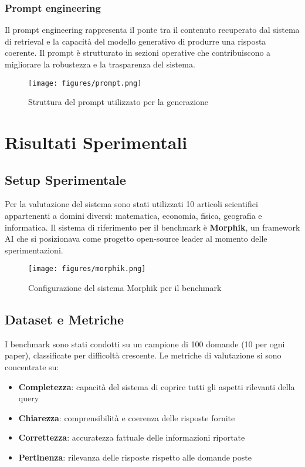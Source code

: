 \documentclass[12pt,a4paper]{article}
\begin{document}
\subsubsection{Prompt engineering}
Il prompt engineering rappresenta il ponte tra il contenuto recuperato dal sistema di retrieval e la capacità del modello generativo di produrre una risposta coerente. Il prompt è strutturato in sezioni operative che contribuiscono a migliorare la robustezza e la trasparenza del sistema.

\begin{figure}[!ht]
\centering
\texttt{[image: figures/prompt.png]}
\caption{Struttura del prompt utilizzato per la generazione}
\label{fig:prompt_structure}
\end{figure}

\section{Risultati Sperimentali}

\subsection{Setup Sperimentale}
Per la valutazione del sistema sono stati utilizzati 10 articoli scientifici appartenenti a domini diversi: matematica, economia, fisica, geografia e informatica. Il sistema di riferimento per il benchmark è \textbf{Morphik}, un framework AI che si posizionava come progetto open-source leader al momento delle sperimentazioni.

\begin{figure}[H]
\centering
\texttt{[image: figures/morphik.png]}
\caption{Configurazione del sistema Morphik per il benchmark}
\label{fig:morphik_config}
\end{figure}

\subsection{Dataset e Metriche}
I benchmark sono stati condotti su un campione di 100 domande (10 per ogni paper), classificate per difficoltà crescente. Le metriche di valutazione si sono concentrate su:

\begin{itemize}
    \item \textbf{Completezza}: capacità del sistema di coprire tutti gli aspetti rilevanti della query
    \item \textbf{Chiarezza}: comprensibilità e coerenza delle risposte fornite
    \item \textbf{Correttezza}: accuratezza fattuale delle informazioni riportate
    \item \textbf{Pertinenza}: rilevanza delle risposte rispetto alle domande poste
\end{itemize}
\end{document}
